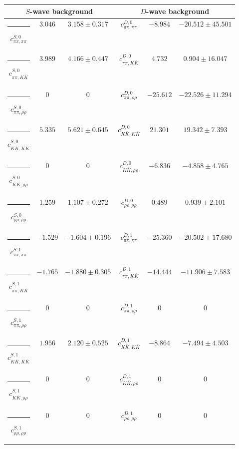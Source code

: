 \begin{table}[h]
\begin{ruledtabular}
\begin{tabular}{c c c c c c c c c}
\end{tabular}
\vspace{2em}
\begin{tabular}{c c c c c c}
\multicolumn{3}{c}{$S$-wave background}  & \multicolumn{3}{c}{$D$-wave background} \\ \hline
\rule[-0.2cm]{-0.1cm}{.55cm} $c^{S,0}_{\pi\pi,\pi\pi}$ &$3.046$ & $3.158 \pm 0.317$ & $c^{D,0}_{\pi\pi,\pi\pi}$ &$-8.984$ & $-20.512 \pm 45.501$ \\
\rule[-0.2cm]{-0.1cm}{.55cm} $c^{S,0}_{\pi\pi,K\bar K}$ &$3.989$ & $4.166 \pm 0.447$ & $c^{D,0}_{\pi\pi,K\bar K}$ &$4.732$ & $0.904 \pm 16.047$ \\
\rule[-0.2cm]{-0.1cm}{.55cm} $c^{S,0}_{\pi\pi,\rho\rho}$ &$0$ & $0$ & $c^{D,0}_{\pi\pi,\rho\rho}$ &$-25.612$ & $-22.526 \pm 11.294$ \\
\rule[-0.2cm]{-0.1cm}{.55cm} $c^{S,0}_{K\bar K,K\bar K}$ &$5.335$ & $5.621 \pm 0.645$ & $c^{D,0}_{K\bar K,K\bar K}$ &$21.301$ & $19.342 \pm 7.393$ \\
\rule[-0.2cm]{-0.1cm}{.55cm} $c^{S,0}_{K\bar K,\rho\rho}$ &$0$ & $0$ & $c^{D,0}_{K\bar K,\rho\rho}$ &$-6.836$ & $-4.858 \pm 4.765$ \\
\rule[-0.2cm]{-0.1cm}{.55cm} $c^{S,0}_{\rho\rho,\rho\rho}$ &$1.259$ & $1.107 \pm 0.272$ & $c^{D,0}_{\rho\rho,\rho\rho}$ &$0.489$ & $0.939 \pm 2.101$ \\
\rule[-0.2cm]{-0.1cm}{.55cm} $c^{S,1}_{\pi\pi,\pi\pi}$ &$-1.529$ & $-1.604 \pm 0.196$ & $c^{D,1}_{\pi\pi,\pi\pi}$ &$-25.360$ & $-20.502 \pm 17.680$ \\
\rule[-0.2cm]{-0.1cm}{.55cm} $c^{S,1}_{\pi\pi,K\bar K}$ &$-1.765$ & $-1.880 \pm 0.305$ & $c^{D,1}_{\pi\pi,K\bar K}$ &$-14.444$ & $-11.906 \pm 7.583$ \\
\rule[-0.2cm]{-0.1cm}{.55cm} $c^{S,1}_{\pi\pi,\rho\rho}$ &$0$ & $0$ & $c^{D,1}_{\pi\pi,\rho\rho}$ &$0$ & $0$ \\
\rule[-0.2cm]{-0.1cm}{.55cm} $c^{S,1}_{K\bar K,K\bar K}$ &$1.956$ & $2.120 \pm 0.525$ & $c^{D,1}_{K\bar K,K\bar K}$ &$-8.864$ & $-7.494 \pm 4.503$ \\
\rule[-0.2cm]{-0.1cm}{.55cm} $c^{S,1}_{K\bar K,\rho\rho}$ &$0$ & $0$ & $c^{D,1}_{K\bar K,\rho\rho}$ &$0$ & $0$ \\
\rule[-0.2cm]{-0.1cm}{.55cm} $c^{S,1}_{\rho\rho,\rho\rho}$ &$0$ & $0$ & $c^{D,1}_{\rho\rho,\rho\rho}$ &$0$ & $0$ \\
\end{tabular}
\end{ruledtabular}
\end{table}
